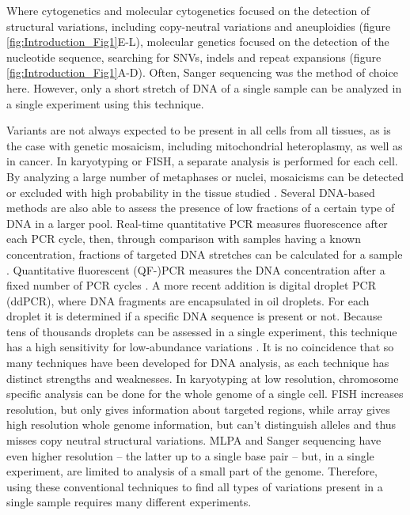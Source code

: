 Where cytogenetics and molecular cytogenetics focused on the detection of structural variations, including copy-neutral variations and aneuploidies (figure \ref{fig:Introduction_Fig1}E-L), molecular genetics focused on the detection of the nucleotide sequence, searching for SNVs, indels and repeat expansions (figure \ref{fig:Introduction_Fig1}A-D). 
Often, Sanger sequencing was the method of choice here. 
However, only a short stretch of DNA of a single sample can be analyzed in a single experiment using this technique. 

Variants are not always expected to be present in all cells from all tissues, as is the case with genetic mosaicism, including mitochondrial heteroplasmy, as well as in cancer. 
In karyotyping or FISH, a separate analysis is performed for each cell. 
By analyzing a large number of metaphases or nuclei, mosaicisms can be detected or excluded with high probability in the tissue studied \cite{Hook_1977,Sikkema_1997,Wolff_2007}. 
Several DNA-based methods are also able to assess the presence of low fractions of a certain type of DNA in a larger pool. 
Real-time quantitative PCR measures fluorescence after each PCR cycle, then, through comparison with samples having a known concentration, fractions of targeted DNA stretches can be calculated for a sample \cite{Heid_1996}. 
Quantitative fluorescent (QF-)PCR measures the DNA concentration after a fixed number of PCR cycles \cite{Eggeling_1993}. 
A more recent addition is digital droplet PCR (ddPCR), where DNA fragments are encapsulated in oil droplets. 
For each droplet it is determined if a specific DNA sequence is present or not. Because tens of thousands droplets can be assessed in a single experiment, this technique has a high sensitivity for low-abundance variations \cite{Hindson_2011}.
It is no coincidence that so many techniques have been developed for DNA analysis, as each technique has distinct strengths and weaknesses. 
In karyotyping at low resolution, chromosome specific analysis can be done for the whole genome of a single cell. 
FISH increases resolution, but only gives information about targeted regions, while array gives high resolution whole genome information, but can’t distinguish alleles and thus misses copy neutral structural variations. 
MLPA and Sanger sequencing have even higher resolution – the latter up to a single base pair – but, in a single experiment, are limited to analysis of a small part of the genome. 
Therefore, using these conventional techniques to find all types of variations present in a single sample requires many different experiments. 


